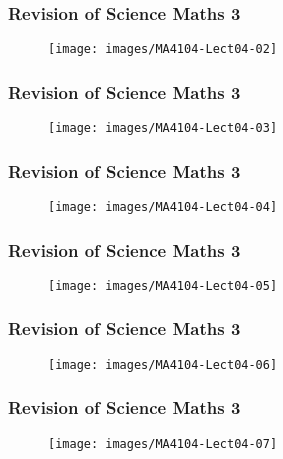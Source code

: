 \documentclass{beamer}
\begin{document}
	\begin{frame}
		\frametitle{Revision of Science Maths 3}
		\begin{figure}
			\centering
			\texttt{[image: images/MA4104-Lect04-02]}
			
		\end{figure}
	\end{frame}
	\begin{frame}
		\frametitle{Revision of Science Maths 3}
		\begin{figure}
			\centering
			\texttt{[image: images/MA4104-Lect04-03]}
			
		\end{figure}
	\end{frame}
	\begin{frame}
		\frametitle{Revision of Science Maths 3}
		\begin{figure}
			\centering
			\texttt{[image: images/MA4104-Lect04-04]}
			
		\end{figure}
	\end{frame}
	\begin{frame}
		\frametitle{Revision of Science Maths 3}
		\begin{figure}
			\centering
			\texttt{[image: images/MA4104-Lect04-05]}
			
		\end{figure}
	\end{frame}
	\begin{frame}
		\frametitle{Revision of Science Maths 3}
		\begin{figure}
			\centering
			\texttt{[image: images/MA4104-Lect04-06]}
			
		\end{figure}
	\end{frame}
	\begin{frame}
		\frametitle{Revision of Science Maths 3}
		\begin{figure}
			\centering
			\texttt{[image: images/MA4104-Lect04-07]}
			
		\end{figure}
	\end{frame}
\end{document}
